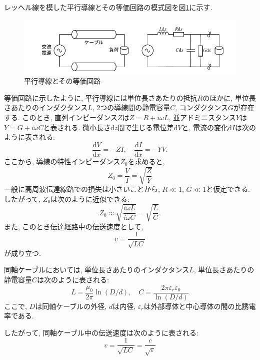 \documentclass[uplatex,dvipdfmx,a4j,12pt]{jsarticle}
\newcommand{\diff}{\mathrm{d}} %
\begin{document}
レッヘル線を模した平行導線とその等価回路の模式図を図\ref{fig:lecher_line}に示す.
\begin{figure}[h]
    \centering
    \includegraphics[width=0.9\linewidth]{img/lecher_line.pdf}
    \caption{平行導線とその等価回路}
    \label{fig:lecher_line}
\end{figure}

等価回路に示したように, 平行導線には単位長さあたりの抵抗$R$のほかに, 単位長さあたりのインダクタンス$L$, 
2つの導線間の静電容量$C$, コンダクタンス$G$が存在する.
このとき, 直列インピーダンス$Z$は$Z = R + i\omega L$, 並アドミニスタンス$Y$は$Y = G + i\omega C$と表される.
微小長さ$\diff z$間で生じる電位差$\diff V$と, 電流の変化$\diff I$は次のように表される:
\begin{equation}
  \frac{\diff V}{\diff x} = - Z I, \quad \frac{\diff I}{\diff x} = - Y V.
\end{equation}
ここから, 導線の特性インピーダンス$Z_0$を求めると,
\begin{equation}
  Z_0 = \frac{V}{I} = \sqrt{\frac{Z}{Y}} 
\end{equation}
一般に高周波伝達線路での損失は小さいことから, $R \ll 1$, $G \ll 1$と仮定できる.
したがって, $Z_0$は次のように近似できる:
\begin{equation}
  Z_0 \approx \sqrt{\frac{i\omega L}{i\omega C}} = \sqrt{\frac{L}{C}}.
\end{equation}
また, このとき伝達経路中の伝送速度として,
\begin{equation}
  v = \frac{1}{\sqrt{LC}}
\end{equation}
が成り立つ.

\enskip

同軸ケーブルにおいては, 単位長さあたりのインダクタンス$L$, 単位長さあたりの静電容量$C$は次のように表される:
\begin{equation}
  L = \frac{\mu_0}{2\pi} \ln\left(D/d\right), \quad C = \frac{2\pi\varepsilon_r \varepsilon_0}{\ln\left(D/d\right) }
\end{equation}
ここで, $D$は同軸ケーブルの外径, $d$は内径, $\varepsilon_r$は外部導体と中心導体の間の比誘電率である.

したがって, 同軸ケーブル中の伝送速度は次のように表される:
\begin{equation}
  v = \frac{1}{\sqrt{LC}} = \frac{c}{\sqrt{\varepsilon}}
\end{equation}
\end{document}
